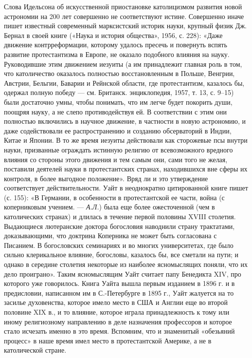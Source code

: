 Слова Идельсона об искусственной приостановке католицизмом развития новой
астрономии на 200 лет совершенно не соответствуют истине. Совершенно иначе
пишет известный современный марксистский историк науки, крупный физик Дж.
Бернал в своей книге («Наука и история общества», 1956, с. 228): «Даже движение
контрреформации, которому удалось пресечь и повернуть вспять развитие
протестантизма в Европе, не оказало подобного влияния на науку. Руководившие
этим движением иезуиты (а им принадлежит главная роль в том, что католичество
оказалось полностью восстановленным в Польше, Венгрии, Австрии, Бельгии,
Баварии и Рейнской области, где протестантизм, казалось бы, одержал полную
победу --- см. Британск. энциклопедия, 1957, т. 13, с. 9--15) были достаточно
умны, чтобы понимать, что им легче будет покорить души, поощряя науку, а не
слепо противодействуя ей. В соответствии с этим они полностью включились в
научное движение, в частности в новую астрономию, и даже содействовали ее
распространению и созданию обсерваторий в Индии, Китае и Японии. В то же время
иезуиты действовали как сторожевые псы внутри науки, призванные ограждать
истинную религию от всевозможного вредного влияния со стороны этого движения и
тем самым они, сами того не желая, поставили деятелей науки в протестантских
странах, находившихся вне сферы их контроля, в более выгодное положение». Вряд
ли и это утверждение соответствует действительности. Уайт в неоднократно
цитированной книге пишет (с. 155): «В Германии, в особенности в протестантской
ее части, война (с коперниковым учением. --- \emph{А.Л.}) была еще более ожесточенной
(чем в католических странах) и длилась в течение первой половины XVIII
столетия. Выдающиеся лютеранские доктора богословия наводнили страну
трактатами, доказывающими, что доктрина Коперника не может быть согласована с
Писанием. В богословских семинариях и во многих университетах, где было сильно
клерикальное влияние, богословы, казалось бы, все сметали на пути; и однако в
середине столетия некоторые из наиболее ясномыслящих поняли, что их дело
проиграно». Таким ясномыслящим Уайт считает папу Бенедикта XIV, про которого
уже говорилось. Книга Уайта вышла первым изданием в 1896 г. и в предисловии,
написанном им в С.-Петербурге в 1895 г., Уайт жалуется на то засилье
духовенства, которое имело место в США и Англии еще во второй половине XIX в.,
и то влияние, которое играла принадлежность к тому или иному религиозному
направлению в деле назначения профессоров и которое стало исчезать именно в это
время. Вспомним, что и знаменитый «обезьяний процесс» в наше время имел место в
протестантской Америке, а не в католической стране.

